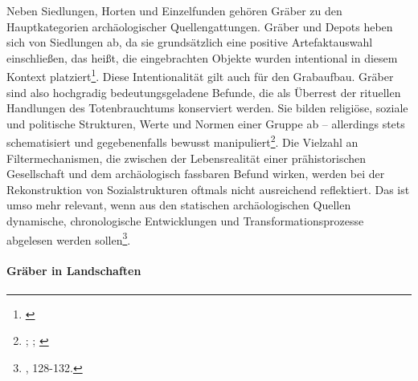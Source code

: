 \documentclass[openany,twoside,twocolumn]{book}
\let\rmarkdownfootnote\footnote%
\def\footnote{\protect\rmarkdownfootnote}
\begin{document}
Neben Siedlungen, Horten und Einzelfunden gehören Gräber zu den
Hauptkategorien archäologischer Quellengattungen. Gräber und Depots
heben sich von Siedlungen ab, da sie grundsätzlich eine positive
Artefaktauswahl einschließen, das heißt, die eingebrachten Objekte
wurden intentional in diesem Kontext platziert\footnote{\textcite{eggers_einfuhrung_1959}}.
Diese Intentionalität gilt auch für den Grabaufbau. Gräber sind also
hochgradig bedeutungsgeladene Befunde, die als Überrest der rituellen
Handlungen des Totenbrauchtums konserviert werden. Sie bilden religiöse,
soziale und politische Strukturen, Werte und Normen einer Gruppe ab --
allerdings stets schematisiert und gegebenenfalls bewusst
manipuliert\footnote{\textcite{harke_final_1997};
  \textcite{humphreys_comparative_1981}; \textcite{palgi_death_1984}}.
Die Vielzahl an Filtermechanismen, die zwischen der Lebensrealität einer
prähistorischen Gesellschaft und dem archäologisch fassbaren Befund
wirken, werden bei der Rekonstruktion von Sozialstrukturen oftmals nicht
ausreichend reflektiert. Das ist umso mehr relevant, wenn aus den
statischen archäologischen Quellen dynamische, chronologische
Entwicklungen und Transformationsprozesse abgelesen werden
sollen\footnote{\textcite{hofmann_rituelle_2008}, 128-132.}.

\hypertarget{graber-in-landschaften}{%
\paragraph{Gräber in Landschaften}\label{graber-in-landschaften}}
\end{document}
